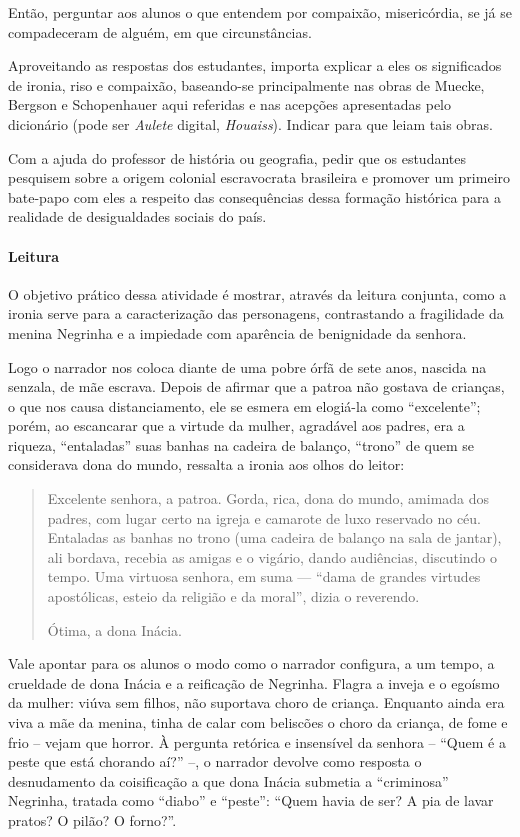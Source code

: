 \documentclass[11pt]{extarticle}
\begin{document}
Então, perguntar aos alunos o que entendem por compaixão, misericórdia,
se já se compadeceram de alguém, em que circunstâncias.

Aproveitando as respostas dos estudantes, importa explicar a eles os
significados de ironia, riso e compaixão, baseando-se principalmente nas
obras de Muecke, Bergson e Schopenhauer aqui referidas e nas acepções
apresentadas pelo dicionário (pode ser \emph{Aulete} digital,
\emph{Houaiss}). Indicar para que leiam tais obras.

Com a ajuda do professor de história ou geografia, 
pedir que os estudantes pesquisem sobre a origem colonial escravocrata
brasileira e promover um primeiro bate-papo com eles a respeito das
consequências dessa formação histórica para a realidade de desigualdades
sociais do país.

\asterisc\paragraph{Leitura}

O objetivo prático dessa atividade é mostrar, através 
da leitura conjunta, como a ironia serve para 
a caracterização das personagens,
contrastando a fragilidade da menina Negrinha e a impiedade com
aparência de benignidade da senhora.

Logo o narrador nos coloca diante de uma pobre órfã de sete anos,
nascida na senzala, de mãe escrava. Depois de afirmar que a patroa não
gostava de crianças, o que nos causa distanciamento, ele se esmera em
elogiá-la como ``excelente''; porém, ao escancarar que a virtude da
mulher, agradável aos padres, era a riqueza, ``entaladas'' suas banhas
na cadeira de balanço, ``trono'' de quem se considerava dona do mundo,
ressalta a ironia aos olhos do leitor:

\begin{quote}
Excelente senhora, a patroa. Gorda, rica, dona do mundo, amimada dos
padres, com lugar certo na igreja e camarote de luxo reservado no céu.
Entaladas as banhas no trono (uma cadeira de balanço na sala de jantar),
ali bordava, recebia as amigas e o vigário, dando audiências, discutindo
o tempo. Uma virtuosa senhora, em suma --- ``dama de grandes virtudes
apostólicas, esteio da religião e da moral'', dizia o reverendo.

Ótima, a dona Inácia.
\end{quote}

Vale apontar para os alunos o modo como o narrador configura, a um
tempo, a crueldade de dona Inácia e a reificação de Negrinha. Flagra a
inveja e o egoísmo da mulher: viúva sem filhos, não suportava choro de
criança. Enquanto ainda era viva a mãe da menina, tinha de calar com
beliscões o choro da criança, de fome e frio -- vejam que horror. À
pergunta retórica e insensível da senhora -- ``Quem é a peste que está
chorando aí?'' --, o narrador devolve como resposta o desnudamento da
coisificação a que dona Inácia submetia a ``criminosa'' Negrinha,
tratada como ``diabo'' e ``peste'': ``Quem havia de ser? A pia de lavar
pratos? O pilão? O forno?''.
\end{document}
